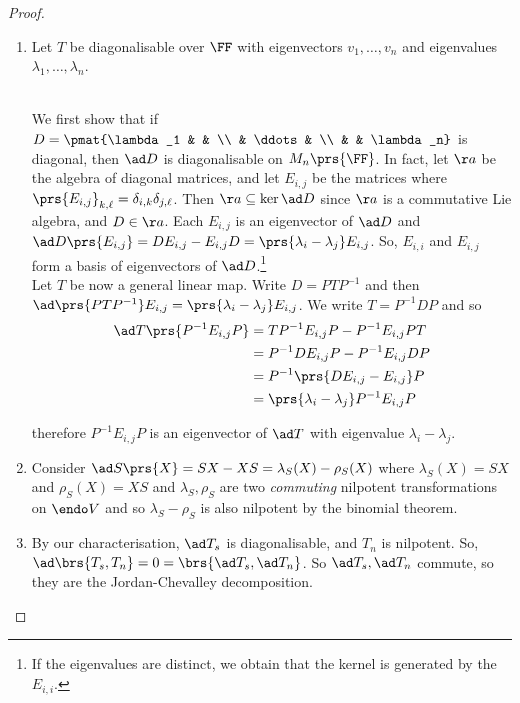 \documentclass[10pt,a4paper,twoside,openany,hidelinks]{book}
\begin{document}
\begin{proof}
\begin{enumerate}
\item
Let $T$ be diagonalisable over $\FF$ with eigenvectors $v_1, \ldots, v_n$ and eigenvalues $\lambda_1, \ldots, \lambda_n$.

\\
We first show that if $D = \pmat{\lambda_1 & & \\ & \ddots & \\ & & \lambda_n}$ is diagonal, then $\ad D$ is diagonalisable on $M_n\prs{\FF}$.
In fact, let $\aa$ be the algebra of diagonal matrices, and let $E_{i,j}$ be the matrices where $\prs{E_{i,j}}_{k,\ell} = \delta_{i,k}\delta_{j,\ell}$.
Then $\aa \subseteq \ker \ad D$ since $\aa$ is a commutative Lie algebra, and $D \in \aa$. Each $E_{i,j}$ is an eigenvector of $\ad D$ and $\ad D\prs{E_{i,j}} = DE_{i,j} - E_{i,j}D =  \prs{\lambda_i - \lambda_j}E_{i,j}$.
So, $E_{i,i}$ and $E_{i,j}$ form a basis of eigenvectors of $\ad D$.\footnote{If the eigenvalues are distinct, we obtain that the kernel is generated by the $E_{i,i}$.}\\
Let $T$ be now a general linear map.
Write $D = PTP^{-1}$ and then $\ad \prs{PTP^{-1}} E_{i,j} = \prs{\lambda_i - \lambda_j}E_{i,j}$. We write $T = P^{-1}DP$ and so 
\begin{align*}
\ad T \prs{P^{-1}E_{i,j}P} &= T P^{-1}E_{i,j}P - P^{-1}E_{i,j}PT \\&= P^{-1}DE_{i,j} P - P^{-1} E_{i,j} D P \\&= P^{-1} \prs{DE_{i,j} - E_{i,j}}P \\&= \prs{\lambda_i - \lambda_j} P^{-1} E_{i,j}P
\end{align*}

therefore $P^{-1} E_{i,j} P$ is an eigenvector of $\ad T$ with eigenvalue $\lambda_i - \lambda_j$.
\item Consider $\ad S \prs{X} = SX - XS = \lambda_S(X) - \rho_S(X)$ where $\lambda_S(X) = SX$ and $\rho_S(X) = XS$ and $\lambda_S,\rho_S$ are two \emph{commuting} nilpotent transformations on $\endo V$ and so $\lambda_S - \rho_S$ is also nilpotent by the binomial theorem.\\
\item
By our characterisation, $\ad T_s$ is diagonalisable, and $T_n$ is nilpotent. So, $\ad \brs{T_s, T_n} = 0 = \brs{\ad T_s, \ad T_n}$. So $\ad T_s, \ad T_n$ commute, so they are the Jordan-Chevalley decomposition.
\end{enumerate}
\end{proof}
\end{document}
